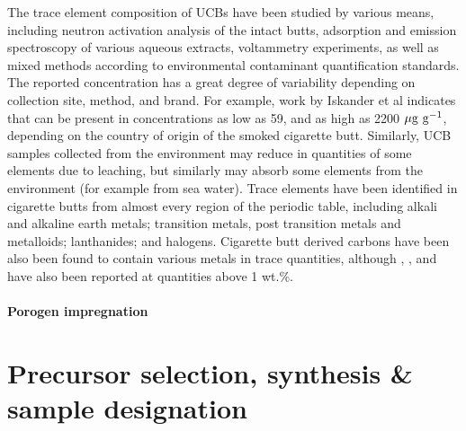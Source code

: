 The trace element composition of UCBs have been studied by various means, including neutron activation analysis of the intact butts,\citep{iskander1992multielement, Iskander1985, jenkins1985neutron, Wu1997} adsorption and emission spectroscopy of various aqueous extracts,\citep{MussaloRauhamaa1986, Kazi2009, Moriwaki2009, Moerman2011, Pelit2013, Dobaradaran2018} voltammetry experiments,\citep{Nitsch1991, Kalcher1993} as well as mixed methods according to environmental contaminant quantification standards.\citep{cardoso2018exposure} The reported concentration has a great degree of variability depending on collection site, method, and brand. For example, work by Iskander et al indicates that  can be present in concentrations as low as 59, and as high as 2200 $\rm{\mu g\ g^{-1}}$, depending on the country of origin of the smoked cigarette butt. Similarly, UCB samples collected from the environment\citep{Dobaradaran2017, Moriwaki2009, Moerman2011, chevalier2018nano} may reduce in quantities of some elements due to leaching, but similarly may absorb some elements from the environment (for example from sea water). Trace elements have been identified in cigarette butts from almost every region of the periodic table, including alkali and alkaline earth metals;\cite{MussaloRauhamaa1986, Iskander1985, iskander1992multielement, jenkins1985neutron, Wu1997, cardoso2018exposure}  transition metals, post transition metals and metalloids;\citep{MussaloRauhamaa1986, Dobaradaran2017, Iskander1985, jenkins1985neutron, Wu1997, Moriwaki2009, Moerman2011, Pelit2013, Dobaradaran2018, Ren2017, cardoso2018exposure, chevalier2018nano} lanthanides;\citep{iskander1992multielement} and halogens.\citep{Iskander1985, iskander1992multielement, jenkins1985neutron, Wu1997} Cigarette butt derived carbons have been also been found to contain various metals in trace quantities,\citep{Soltani, Soltani2013, Yazdi2012} although , , and  have also been reported at quantities above 1 wt.\%.\citep{Soltani, Soltani2013, Yazdi2012, Lima2018}

\paragraph{Porogen impregnation}

\section{Precursor selection, synthesis \& sample designation}

